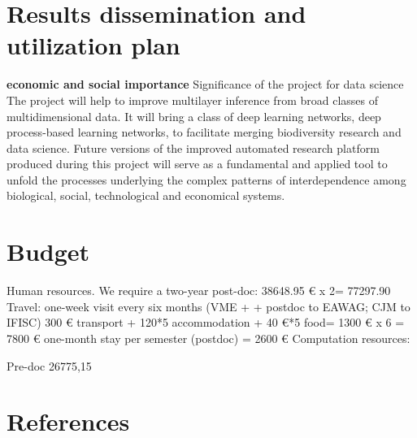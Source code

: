 \documentclass[authoryear,1p,12pt]{elsarticle}
\begin{document}
     \vspace{0.2 in}
     


     \newpage
     \section{Results dissemination and utilization plan}

     {\bf economic and social importance} Significance of the project
     for data science The project will help to improve multilayer
     inference from broad classes of multidimensional data. It will
     bring a class of deep learning networks, deep process-based
     learning networks, to facilitate merging biodiversity research
     and data science. Future versions of the improved automated
     research platform produced during this project will serve as a
     fundamental and applied tool to unfold the processes underlying
     the complex patterns of interdependence among biological, social,
     technological and economical systems.
    
     \newpage
     \section{Budget}
     
     Human resources.
     We require a two-year post-doc: 38648.95 € x 2= 77297.90
     Travel: one-week visit every six months (VME + + postdoc to EAWAG; CJM to IFISC) 300 € transport + 120*5 accommodation + 40 €*5 food= 1300 € x 6 = 7800 €
     one-month stay per semester (postdoc) = 2600 €
     Computation resources: 
     
     Pre-doc 26775,15

     \newpage

\section{References}


\end{document}
